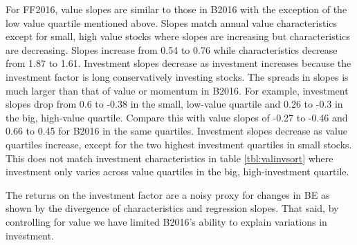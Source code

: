 For FF2016, value slopes are similar to those in B2016 with the exception of the low value
quartile mentioned above. Slopes match annual value characteristics except for small, high
value stocks where slopes are increasing but characteristics are decreasing. Slopes
increase from 0.54 to 0.76 while characteristics decrease from 1.87 to 1.61. Investment
slopes decrease as investment increases because the investment factor is long
conservatively investing stocks. The spreads in slopes is much larger than that of value
or momentum in B2016. For example, investment slopes drop from 0.6 to -0.38 in the small,
low-value quartile and 0.26 to -0.3 in the big, high-value quartile. Compare this with
value slopes of -0.27 to -0.46 and 0.66 to 0.45 for B2016 in the same quartiles.
Investment slopes decrease as value quartiles increase, except for the two highest
investment quartiles in small stocks. This does not match investment characteristics in
table \ref{tbl:valinvsort} where investment only varies across value quartiles in the big,
high-investment quartile.

The returns on the investment factor are a noisy proxy for changes in BE as shown by the
divergence of characteristics and regression slopes. That said, by controlling for value
we have limited B2016's ability to explain variations in investment.

\restoregeometry
